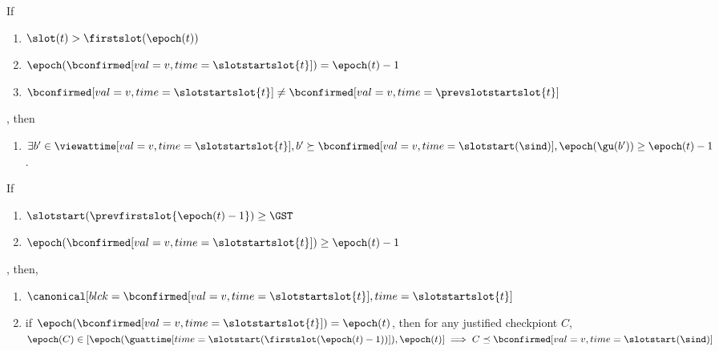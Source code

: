 \documentclass{article}
\begin{document}
\begin{lemma}\label{lem:conf-prev-epoch-in-current-epoch-exists-succ-with-gu-from-prev-epoch}
    If
    \begin{enumerate}
        \item $\slot(t)>\firstslot(\epoch(t))$
        \item $\epoch(\bconfirmed[val=v,time=\slotstartslot{t}]) = \epoch(t)-1$
        \item $\bconfirmed[val=v,time=\slotstartslot{t}]\neq\bconfirmed[val=v,time=\prevslotstartslot{t}]$
    \end{enumerate}
    , then
    \begin{enumerate}
        \item $\exists b' \in \viewattime[val=v,time=\slotstartslot{t}], b' \succeq \bconfirmed[val=v,time=\slotstart(\sind)], \epoch(\gu(b'))\geq \epoch(t)-1$. 
    \end{enumerate}
\end{lemma}

\begin{lemma}\label{lem:canonical-no-extra-assum}
    If
    \begin{enumerate}
        \item $\slotstart(\prevfirstslot{\epoch(t)-1})\geq \GST$
        \item $\epoch(\bconfirmed[val=v,time=\slotstartslot{t}]) \geq \epoch(t)-1$
    \end{enumerate},
    then,
    \begin{enumerate}
        \item $\canonical[blck={\bconfirmed[val=v,time=\slotstartslot{t}]},time=\slotstartslot{t}]$
        \item\label{itm:lem:conf-prev-epoch-in-current-epoch-exists-succ-with-gu-from-prev-epoch:conc2} if $\epoch(\bconfirmed[val=v,time=\slotstartslot{t}]) = \epoch(t)$, then for any justified checkpiont $C$, $\epoch(C) \in [\epoch(\guattime[time=\slotstart(\firstslot(\epoch(t)-1))]),\epoch(t)] \implies C  \preceq \bconfirmed[val=v,time=\slotstart(\sind)]$
    \end{enumerate}
\end{lemma}
\end{document}
